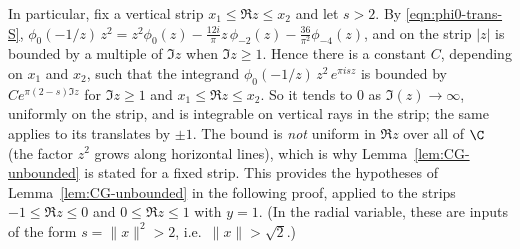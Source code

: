 In particular, fix a vertical strip $x_1 \leq \Re z \leq x_2$ and let $s > 2$. By \eqref{eqn:phi0-trans-S}, $\phi_0(-1/z)\, z^2 = z^2 \phi_0(z) - \frac{12 i}{\pi} z\, \phi_{-2}(z) - \frac{36}{\pi^2}\phi_{-4}(z)$, and on the strip $|z|$ is bounded by a multiple of $\Im z$ when $\Im z \geq 1$. Hence there is a constant $C$, depending on $x_1$ and $x_2$, such that the integrand $\phi_0(-1/z)\, z^2\, e^{\pi i s z}$ is bounded by $C e^{\pi (2 - s)\Im z}$ for $\Im z \geq 1$ and $x_1 \leq \Re z \leq x_2$. So it tends to $0$ as $\Im(z) \to \infty$, uniformly on the strip, and is integrable on vertical rays in the strip; the same applies to its translates by $\pm 1$. The bound is \emph{not} uniform in $\Re z$ over all of $\C$ (the factor $z^2$ grows along horizontal lines), which is why Lemma~\ref{lem:CG-unbounded} is stated for a fixed strip. This provides the hypotheses of Lemma~\ref{lem:CG-unbounded} in the following proof, applied to the strips $-1 \leq \Re z \leq 0$ and $0 \leq \Re z \leq 1$ with $y = 1$. (In the radial variable, these are inputs of the form $s = \|x\|^2 > 2$, i.e.\ $\|x\| > \sqrt 2$.)

